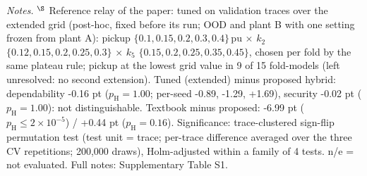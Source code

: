 \begin{table}[!htbp]\centering
\caption{Conventional relays on the benchmark data (dependability / security, \%): unrestrained dual-slope 87T, harmonic-restrained 87T with textbook settings, and harmonic-restrained 87T tuned on validation traces over the original and over the extended grid (post-hoc; the reference relay of this paper), against the proposed relay. Plant-A CV (3 seeds $\times$ 5 folds, common set), OOD (final scoring) and plant-B zero-shot.}\label{tab:pC_conventional}
\small{}
\vspace{3pt}\par\raggedright\footnotesize\textit{Notes.} $^{\S}$ Reference relay of the paper: tuned on validation traces over the extended grid (post-hoc, fixed before its run; OOD and plant B with one setting frozen from plant A): pickup $\{0.1, 0.15, 0.2, 0.3, 0.4\}$\,pu $\times$ $k_2$ $\{0.12, 0.15, 0.2, 0.25, 0.3\}$ $\times$ $k_5$ $\{0.15, 0.2, 0.25, 0.35, 0.45\}$, chosen per fold by the same plateau rule; pickup at the lowest grid value in 9 of 15 fold-models (left unresolved: no second extension). Tuned (extended) minus proposed hybrid: dependability -0.16 pt ($p_{\mathrm{H}}=1.00$; per-seed -0.89, -1.29, +1.69), security -0.02 pt ($p_{\mathrm{H}}=1.00$): not distinguishable. Textbook minus proposed: -6.99 pt ($p_{\mathrm{H}}\le2\times10^{-5}$) / +0.44 pt ($p_{\mathrm{H}}=0.16$). Significance: trace-clustered sign-flip permutation test (test unit = trace; per-trace difference averaged over the three CV repetitions; 200{,}000 draws), Holm-adjusted within a family of 4 tests. n/e = not evaluated. Full notes: Supplementary Table S1.
\end{table}